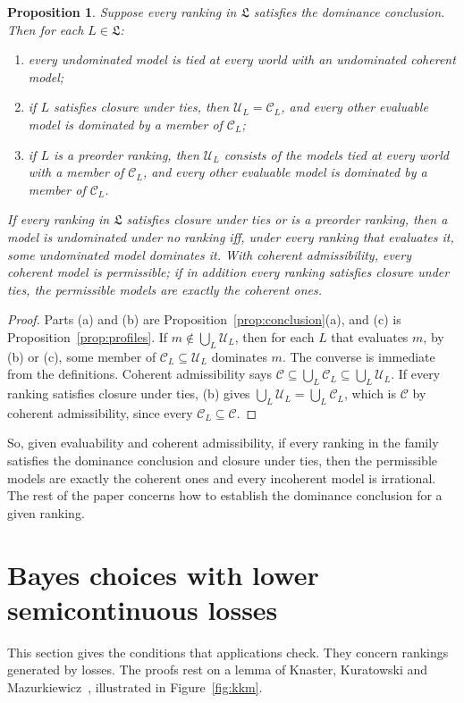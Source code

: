 \documentclass[11pt]{article}
\newtheorem{proposition}[theorem]{Proposition}
\theoremstyle{definition}
\theoremstyle{remark}
\newcommand{\C}{\mathcal C}
\newcommand{\U}{\mathcal U}
\newcommand{\Lf}{\mathfrak L}
\begin{document}
\begin{proposition}\label{prop:permissible}
Suppose every ranking in $\Lf$ satisfies the dominance conclusion. Then for each $L\in\Lf$:
\begin{enumerate}[label=(\alph*)]
\item every undominated model is tied at every world with an undominated coherent model;
\item if $L$ satisfies closure under ties, then $\U_L=\C_L$, and every other evaluable model is dominated by a member of $\C_L$;
\item if $L$ is a preorder ranking, then $\U_L$ consists of the models tied at every world with a member of $\C_L$, and every other evaluable model is dominated by a member of $\C_L$.
\end{enumerate}
If every ranking in $\Lf$ satisfies closure under ties or is a preorder ranking, then a model is undominated under no ranking iff, under every ranking that evaluates it, some undominated model dominates it. With coherent admissibility, every coherent model is permissible; if in addition every ranking satisfies closure under ties, the permissible models are exactly the coherent ones.
\end{proposition}
\begin{proof}
Parts (a) and (b) are Proposition~\ref{prop:conclusion}(a), and (c) is Proposition~\ref{prop:profiles}. If $m\notin\bigcup_L\U_L$, then for each $L$ that evaluates $m$, by (b) or (c), some member of $\C_L\subseteq\U_L$ dominates $m$. The converse is immediate from the definitions. Coherent admissibility says $\C\subseteq\bigcup_L\C_L\subseteq\bigcup_L\U_L$. If every ranking satisfies closure under ties, (b) gives $\bigcup_L\U_L=\bigcup_L\C_L$, which is $\C$ by coherent admissibility, since every $\C_L\subseteq\C$.
\end{proof}
So, given evaluability and coherent admissibility, if every ranking in the family satisfies the dominance conclusion and closure under ties, then the permissible models are exactly the coherent ones and every incoherent model is irrational. The rest of the paper concerns how to establish the dominance conclusion for a given ranking.


\section{Bayes choices with lower semicontinuous losses}\label{sec:bayes}

This section gives the conditions that applications check. They concern rankings generated by losses. The proofs rest on a lemma of Knaster, Kuratowski and Mazurkiewicz~\cite{KKM}, illustrated in Figure~\ref{fig:kkm}.
\end{document}
